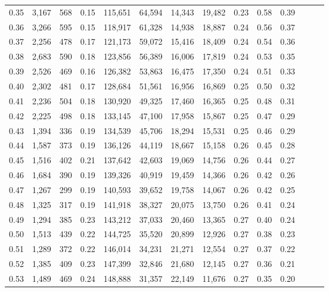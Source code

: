 \begin{tabular}{rrrrrrrrrrrrrr}
0.35 &  3,167 &  568 &  0.15 &  115,651 &   64,594 &  14,343 &  19,482 &  0.23 &  0.58 &      0.39 \\
0.36 &  3,266 &  595 &  0.15 &  118,917 &   61,328 &  14,938 &  18,887 &  0.24 &  0.56 &      0.37 \\
0.37 &  2,256 &  478 &  0.17 &  121,173 &   59,072 &  15,416 &  18,409 &  0.24 &  0.54 &      0.36 \\
0.38 &  2,683 &  590 &  0.18 &  123,856 &   56,389 &  16,006 &  17,819 &  0.24 &  0.53 &      0.35 \\
0.39 &  2,526 &  469 &  0.16 &  126,382 &   53,863 &  16,475 &  17,350 &  0.24 &  0.51 &      0.33 \\
0.40 &  2,302 &  481 &  0.17 &  128,684 &   51,561 &  16,956 &  16,869 &  0.25 &  0.50 &      0.32 \\
0.41 &  2,236 &  504 &  0.18 &  130,920 &   49,325 &  17,460 &  16,365 &  0.25 &  0.48 &      0.31 \\
0.42 &  2,225 &  498 &  0.18 &  133,145 &   47,100 &  17,958 &  15,867 &  0.25 &  0.47 &      0.29 \\
0.43 &  1,394 &  336 &  0.19 &  134,539 &   45,706 &  18,294 &  15,531 &  0.25 &  0.46 &      0.29 \\
0.44 &  1,587 &  373 &  0.19 &  136,126 &   44,119 &  18,667 &  15,158 &  0.26 &  0.45 &      0.28 \\
0.45 &  1,516 &  402 &  0.21 &  137,642 &   42,603 &  19,069 &  14,756 &  0.26 &  0.44 &      0.27 \\
0.46 &  1,684 &  390 &  0.19 &  139,326 &   40,919 &  19,459 &  14,366 &  0.26 &  0.42 &      0.26 \\
0.47 &  1,267 &  299 &  0.19 &  140,593 &   39,652 &  19,758 &  14,067 &  0.26 &  0.42 &      0.25 \\
0.48 &  1,325 &  317 &  0.19 &  141,918 &   38,327 &  20,075 &  13,750 &  0.26 &  0.41 &      0.24 \\
0.49 &  1,294 &  385 &  0.23 &  143,212 &   37,033 &  20,460 &  13,365 &  0.27 &  0.40 &      0.24 \\
0.50 &  1,513 &  439 &  0.22 &  144,725 &   35,520 &  20,899 &  12,926 &  0.27 &  0.38 &      0.23 \\
0.51 &  1,289 &  372 &  0.22 &  146,014 &   34,231 &  21,271 &  12,554 &  0.27 &  0.37 &      0.22 \\
0.52 &  1,385 &  409 &  0.23 &  147,399 &   32,846 &  21,680 &  12,145 &  0.27 &  0.36 &      0.21 \\
0.53 &  1,489 &  469 &  0.24 &  148,888 &   31,357 &  22,149 &  11,676 &  0.27 &  0.35 &      0.20 \\

\end{tabular}
